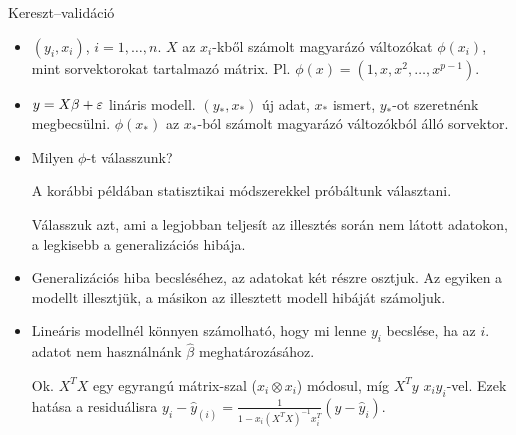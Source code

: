 \documentclass[aspectratio=169,notheorems,9pt,\option]{beamer}\usepackage[]{graphicx}\usepackage[]{color}
\begin{document}
\begin{frame}{Kereszt--validáció}

  \begin{itemize}
    \item $(y_i,x_i)$, $i=1,\dots,n$. $X$ az $x_i$-kből számolt magyarázó változókat 
    $\phi(x_i)$, mint sorvektorokat tartalmazó mátrix. 
    Pl. $\phi(x)=(1,x,x^2,\dots,x^{p-1})$. 
    \item $y=X\beta+\varepsilon$ lináris modell. 
    $(y_{*},x_{*})$ új adat, $x_{*}$ ismert, $y_{*}$-ot szeretnénk megbecsülni.
    $\phi(x_{*})$ az $x_*$-ból számolt 
    magyarázó változókból álló sorvektor.
    \item Milyen $\phi$-t válasszunk?
    
    A korábbi példában statisztikai módszerekkel próbáltunk választani.
    
    Válasszuk azt, ami a legjobban teljesít az 
    illesztés során nem látott adatokon, a legkisebb a generalizációs hibája.
    
    \item Generalizációs hiba becsléséhez, az adatokat két részre osztjuk. 
    Az egyiken a modellt illesztjük, a másikon az illesztett modell hibáját számoljuk.
    
    \item Lineáris modellnél könnyen számolható, hogy mi lenne $y_i$ becslése, ha 
    az $i$. adatot nem használnánk $\hat\beta$ meghatározásához. 

    Ok. $X^TX$  egy egyrangú mátrix-szal ($x_i\otimes x_i$) módosul, 
    míg $X^Ty$  $x_iy_i$-vel. Ezek hatása a residuálisra 
    $y_i-\hat y_{(i)}=\frac1{1-x_i(X^TX)^{-1}x_i^T}(y-\hat y_i)$.
  \end{itemize}
\end{frame}
\end{document}
